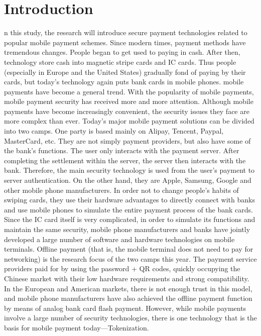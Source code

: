 \documentclass[journal]{IEEEtran}
\begin{document}
\section{Introduction}
n this study, the research will introduce secure payment technologies related to popular mobile payment schemes. Since modern times, payment methods have tremendous changes. People began to get used to paying in cash. After then, technology store cash into magnetic stripe cards and IC cards. Thus people (especially in Europe and the United States) gradually fond of paying by their cards, but today's technology again puts bank cards in mobile phones. mobile payments have become a general trend. With the popularity of mobile payments, mobile payment security has received more and more attention. Although mobile payments have become increasingly convenient, the security issues they face are more complex than ever. Today's major mobile payment solutions can be divided into two camps. One party is based mainly on Alipay, Tencent, Paypal, MasterCard, etc. They are not simply payment providers, but also have some of the bank's functions. The user only interacts with the payment server. After completing the settlement within the server, the server then interacts with the bank. Therefore, the main security technology is used from the user's payment to server authentication. On the other hand, they are Apple, Samsung, Google and other mobile phone manufacturers. In order not to change people's habits of swiping cards, they use their hardware advantages to directly connect with banks and use mobile phones to simulate the entire payment process of the bank cards. Since the IC card itself is very complicated, in order to simulate its functions and maintain the same security, mobile phone manufacturers and banks have jointly developed a large number of software and hardware technologies on mobile terminals. Offline payment (that is, the mobile terminal does not need to pay for networking) is the research focus of the two camps this year. The payment service providers paid for by using the password + QR codes, quickly occupying the Chinese market with their low hardware requirements and strong compatibility. In the European and American markets, there is not enough trust in this model, and mobile phone manufacturers have also achieved the offline payment function by means of analog bank card flash payment. However, while mobile payments involve a large number of security technologies, there is one technology that is the basis for mobile payment today---Tokenization.
\end{document}
